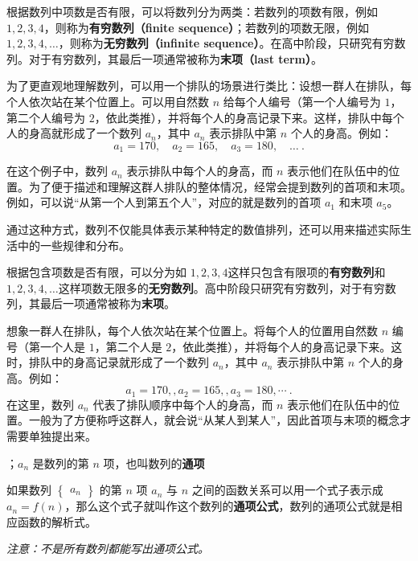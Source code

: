 根据数列中项数是否有限，可以将数列分为两类：若数列的项数有限，例如 $1, 2, 3, 4$，则称为\textbf{有穷数列（finite sequence）}；若数列的项数无限，例如 $1, 2, 3, 4, \dots$，则称为\textbf{无穷数列（infinite sequence）}。在高中阶段，只研究有穷数列。对于有穷数列，其最后一项通常被称为\textbf{末项（last term）}。

为了更直观地理解数列，可以用一个排队的场景进行类比：设想一群人在排队，每个人依次站在某个位置上。可以用自然数 $n$ 给每个人编号（第一个人编号为 $1$，第二个人编号为 $2$，依此类推），并将每个人的身高记录下来。这样，排队中每个人的身高就形成了一个数列 ${a_n}$，其中 $a_n$ 表示排队中第 $n$ 个人的身高。例如：
\begin{equation}
a_1 = 170, \quad a_2 = 165, \quad a_3 = 180, \quad \dots~.
\end{equation}

在这个例子中，数列 ${a_n}$ 表示排队中每个人的身高，而 $n$ 表示他们在队伍中的位置。为了便于描述和理解这群人排队的整体情况，经常会提到数列的首项和末项。例如，可以说“从第一个人到第五个人”，对应的就是数列的首项 $a_1$ 和末项 $a_5$。

通过这种方式，数列不仅能具体表示某种特定的数值排列，还可以用来描述实际生活中的一些规律和分布。


根据包含项数是否有限，可以分为如 $1, 2, 3, 4$这样只包含有限项的\textbf{有穷数列}和$1, 2, 3, 4, \dots$这样项数无限多的\textbf{无穷数列}。高中阶段只研究有穷数列，对于有穷数列，其最后一项通常被称为\textbf{末项}。

想象一群人在排队，每个人依次站在某个位置上。将每个人的位置用自然数 $n$ 编号（第一个人是 $1$，第二个人是 $2$，依此类推），并将每个人的身高记录下来。这时，排队中的身高记录就形成了一个数列 ${a_n}$，其中 $a_n$ 表示排队中第 $n$ 个人的身高。例如：
\begin{equation}
a_1 = 170, , a_2 = 165, , a_3 = 180, \cdots~.
\end{equation}
在这里，数列 ${a_n}$ 代表了排队顺序中每个人的身高，而 $n$ 表示他们在队伍中的位置。一般为了方便称呼这群人，就会说“从某人到某人”，因此首项与末项的概念才需要单独提出来。

；$a_n$ 是数列的第 $n$ 项，也叫数列的\textbf{通项}

如果数列 $\begin{Bmatrix} a_n \end{Bmatrix}$ 的第 $n$ 项 $a_n$ 与 $n$ 之间的函数关系可以用一个式子表示成 $a_n = f(n)$，那么这个式子就叫作这个数列的\textbf{通项公式}，数列的通项公式就是相应函数的解析式。

\textsl{注意：不是所有数列都能写出通项公式。}

